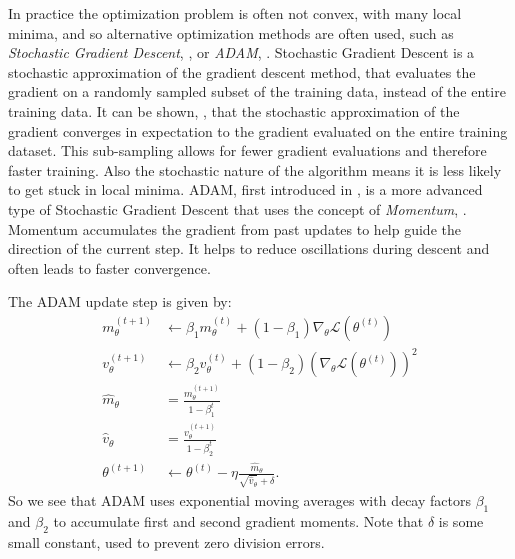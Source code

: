 In practice the optimization problem is often not convex, with many local minima, and so alternative optimization methods
are often used, such as \textit{Stochastic Gradient Descent}, \cite{ROBBINS1951}, or \textit{ADAM}, \cite{ADAM2017}.
Stochastic Gradient Descent is a stochastic approximation of the gradient descent method, that
evaluates the gradient on a randomly sampled subset of the training data, instead of the entire training data.
It can be shown, \cite{ROBBINS1951}, that the stochastic approximation of the gradient converges in expectation to
the gradient evaluated on the entire training dataset.
This sub-sampling allows for fewer gradient evaluations and therefore faster training. Also the stochastic
nature of the algorithm means it is less likely to get stuck in local minima.
ADAM, first introduced in \cite{ADAM2017}, is a more advanced type of Stochastic Gradient Descent
that uses the concept of \textit{Momentum}, \cite{RUMELHART1986}. Momentum accumulates
the gradient from past updates to help guide the direction of the current step. It helps
to reduce oscillations during descent and often leads to faster convergence.

The ADAM update step is given by:
\begin{equation}
    \begin{aligned}
        m_{\theta}^{(t+1)} &\leftarrow \beta _{1}m_{\theta}^{(t)}+\left(1-\beta _{1}\right)\nabla_{\theta} \mathcal{L}(\theta^{(t)}) \\
        v_{\theta}^{(t+1)} &\leftarrow \beta _{2}v_{\theta}^{(t)}+\left(1-\beta _{2}\right)\left(\nabla_{\theta} \mathcal{L}(\theta^{(t)})\right)^{2} \\
        {\hat {m}}_{\theta} &={\frac {m_{\theta}^{(t+1)}}{1-\beta _{1}^{t}}} \\
        {\hat {v}}_{\theta} &={\frac {v_{\theta}^{(t+1)}}{1-\beta _{2}^{t}}} \\
        \theta^{(t+1)} &\leftarrow \theta^{(t)}-\eta {\frac {{\hat {m}}_{\theta}}{{\sqrt {{\hat {v}}_{\theta}}}+\delta }}.
    \end{aligned}
\end{equation}
So we see that ADAM uses exponential moving averages with decay factors $\beta_1$ and $\beta_2$ to accumulate first and
second gradient moments. Note that $\delta$ is some small constant, used to prevent zero division errors.

